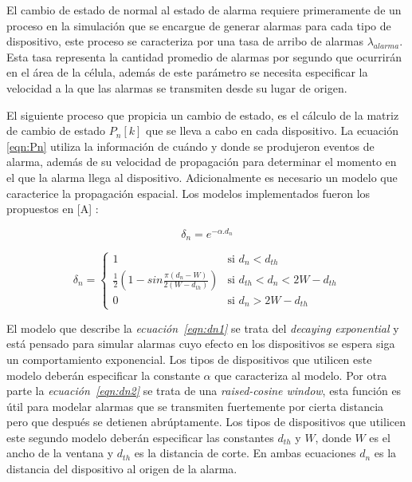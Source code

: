 El cambio de estado de normal  al estado de alarma requiere primeramente de un proceso en la simulación que se encargue de generar alarmas para cada tipo de dispositivo, este proceso se caracteriza por una tasa de arribo de alarmas $ \lambda_{alarma}$. Esta tasa representa la cantidad promedio de alarmas por segundo que ocurrirán en el área de la célula, además de este parámetro se necesita especificar la velocidad a la que las alarmas se transmiten desde su lugar de origen.\newline

El siguiente proceso que propicia un cambio de estado, es el cálculo de la matriz de cambio de estado $P_n\left[k\right]$ que se lleva a cabo en cada dispositivo. La ecuación \ref{eqn:Pn} utiliza la información de cuándo y donde se produjeron eventos de alarma, además de su velocidad de propagación para determinar el momento en el que la alarma llega al dispositivo. Adicionalmente es necesario un modelo que caracterice la propagación espacial. Los modelos implementados fueron los propuestos en [A] :\newline

\begin{equation}
\delta_n = e^{-\alpha.d_{n}}
\label{eqn:dn1}
\end{equation}

\begin{equation}
    \delta_n =
    \begin{cases}
        1  & \text{si $d_n < d_{th}$} \\
        \frac{1}{2}(1-sin\frac{\pi(d_n-W)}{2(W-d_{th})}) & \text{si $d_{th}< d_n < 2W-d_{th}$}\\
        0  & \text{si $d_n > 2W-d_{th}$}
    \end{cases}
    \label{eqn:dn2}
\end{equation}

El modelo que describe la \textit{ecuación~\ref{eqn:dn1}} se trata del \textit{decaying exponential} y está pensado para simular alarmas cuyo efecto en los dispositivos se espera siga un comportamiento exponencial. Los tipos de dispositivos que utilicen este modelo deberán especificar la constante $\alpha$ que caracteriza al modelo. Por otra parte la \textit{ecuación~\ref{eqn:dn2}} se trata de una \textit{raised-cosine window}, esta función es útil para modelar alarmas que se transmiten fuertemente por cierta distancia pero que después se detienen abrúptamente. Los tipos de dispositivos que utilicen este segundo modelo deberán especificar las constantes $d_{th}$ y $W$, donde $W$ es el ancho de la ventana y $d_{th}$ es la distancia de corte. En ambas ecuaciones $d_n$ es la distancia del dispositivo al origen de la alarma.\newline

